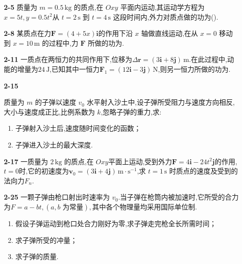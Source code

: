 \begin{enumerate}

\item[\textbf{2-5}]
质量为 \(m=0.5\,\mathrm{kg}\) 的质点,在 \(Oxy\) 平面内运动,其运动学方程为$x=5t,y=0.5t^2$从 \(t=2\,\mathrm{s}\) 到 \(t=4\,\mathrm{s}\) 这段时间内,外力对质点做的功为(\hspace{1em}).


\item[\textbf{2-8}]
某质点在力$\boldsymbol{F}=(4+5x)\boldsymbol{i}$的作用下沿 \(x\) 轴做直线运动,在从 \(x=0\) 移动到 \(x=10\,\mathrm{m}\) 的过程中,力 \(\boldsymbol{F}\) 所做的功为\underline{\hspace{4cm}}.


\item[\textbf{2-11}]
一质点在两恒力的共同作用下,位移为$\Delta\boldsymbol{r}=(3\boldsymbol{i}+8\boldsymbol{j})\,\mathrm{m}.$在此过程中,动能的增量为\(24\,\mathrm{J}\),已知其中一恒力$\boldsymbol{F}_1=(12\boldsymbol{i}-3\boldsymbol{j})\,\mathrm{N}$,则另一恒力所做的功为\underline{\hspace{4cm}}.

\item[\textbf{2-15}]

质量为 \(m\) 的子弹以速度 \(v_0\) 水平射入沙土中,设子弹所受阻力与速度方向相反,大小与速度成正比,比例系数为 \(k\),忽略子弹的重力,求:
\begin{enumerate}
	\item 子弹射入沙土后,速度随时间变化的函数；
	\item 子弹进入沙土的最大深度.
\end{enumerate}


\item[\textbf{2-17}]
一质量为 \(2\,\mathrm{kg}\) 的质点,在 \(Oxy\)平面上运动,受到外力$\boldsymbol{F}=4\boldsymbol{i}-24t^2\boldsymbol{j}$的作用,\(t=0\)时,它的初速度为$\boldsymbol{v}_0=(3\boldsymbol{i}+4\boldsymbol{j})\,\mathrm{m\cdot s^{-1}}$,求 \(t=1\,\mathrm{s}\) 时质点的速度及受到的法向力$F_n$.


\item[\textbf{2-25}]
一颗子弹由枪口射出时速率为 \(v_0\).当子弹在枪筒内被加速时,它所受的合力为$F=a-bt,(a,b\text{ 为常量}),$其中各个物理量均采用国际单位制.  
\begin{enumerate}
	\item 假设子弹运动到枪口处合力刚好为零,求子弹走完枪全长所需时间；
	\item 求子弹所受的冲量；
	\item 求子弹的质量.
\end{enumerate}



\end{enumerate}
